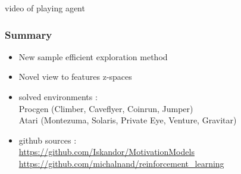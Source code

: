 \documentclass{beamer}
\begin{document}
\begin{frame}
  video of playing agent
\end{frame}



\begin{frame}
  \frametitle{Summary}

  \begin{itemize}
    \item{New sample efficient exploration method}
    \item{Novel view to features z-spaces}
    \item{solved environments : \\ Procgen (Climber, Caveflyer, Coinrun, Jumper) \\ Atari (Montezuma, Solaris, Private Eye, Venture, Gravitar)}
    \item{github sources : {\footnotesize \\ \url{https://github.com/Iskandor/MotivationModels} \\ \url{https://github.com/michalnand/reinforcement_learning}}}
  \end{itemize}
  
  
\end{frame}
\end{document}
